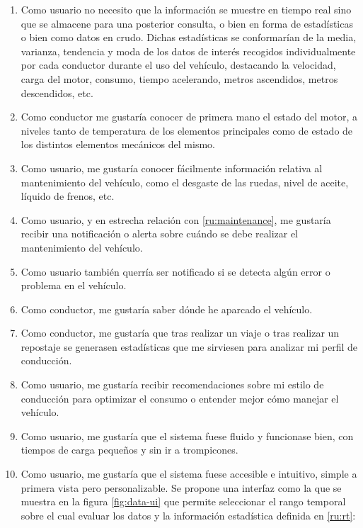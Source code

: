 \begin{enumerate}[label=\textbf{\texttt{RU-\arabic*}}]
  \item\label{ru:rt} Como usuario no necesito que la información se muestre en tiempo
        real sino que se almacene para una posterior consulta, o bien en forma de
        estadísticas o bien como datos en crudo. Dichas estadísticas se conformarían
        de la media, varianza, tendencia y moda de los datos de interés recogidos individualmente
        por cada conductor durante el uso del vehículo, destacando la velocidad,
        carga del motor, consumo, tiempo acelerando, metros ascendidos, metros descendidos,
        etc.
  \item\label{ru:status} Como conductor me gustaría conocer de primera mano el estado
        del motor, a niveles tanto de temperatura de los elementos principales como
        de estado de los distintos elementos mecánicos del mismo.
  \item\label{ru:maintenance} Como usuario, me gustaría conocer fácilmente
        información relativa al mantenimiento del vehículo, como el desgaste de
        las ruedas, nivel de aceite, líquido de frenos, etc.
  \item\label{ru:notifications} Como usuario, y en estrecha relación con
        \ref{ru:maintenance}, me gustaría recibir una notificación o alerta sobre
        cuándo se debe realizar el mantenimiento del vehículo. 
  \item\label{ru:err-notifications} Como usuario también querría ser notificado si se detecta algún error o problema
        en el vehículo.
  \item\label{ru:parking} Como conductor, me gustaría saber dónde he aparcado el
        vehículo.
  \item\label{ru:stats} Como conductor, me gustaría que tras realizar un viaje
        o tras realizar un repostaje se generasen estadísticas que me sirviesen para
        analizar mi perfil de conducción.
  \item\label{ru:recommendations} Como usuario, me gustaría recibir recomendaciones
        sobre mi estilo de conducción para optimizar el consumo o entender mejor cómo
        manejar el vehículo.
  \item\label{ru:speed} Como usuario, me gustaría que el sistema fuese fluido y
        funcionase bien, con tiempos de carga pequeños y sin ir a trompicones.
  \item\label{ru:intuitive} Como usuario, me gustaría que el sistema fuese accesible
        e intuitivo, simple a primera vista pero personalizable.
        Se propone una interfaz como la que se muestra en la figura \ref{fig:data-ui}
        que permite seleccionar el rango temporal sobre el cual evaluar los datos
        y la información estadística definida en \ref{ru:rt}:


\end{enumerate}
